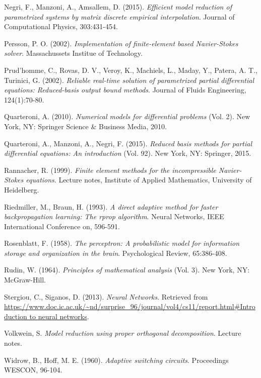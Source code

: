 \documentclass[12pt, a4paper, twoside, openright]{report}
\numberwithin{equation}{chapter}
\theoremstyle{theorem}
\theoremstyle{definition}
\theoremstyle{remark}
\theoremstyle{proposition}
\numberwithin{figure}{chapter}
\begin{document}
\begin{thebibliography}{50}
		Negri, F., Manzoni, A., Amsallem, D. (2015). \emph{Efficient model reduction of parametrized systems by matrix discrete empirical interpolation}. Journal of Computational Physics, 303:431-454.
		
		Persson, P. O. (2002). \emph{Implementation of finite-element based Navier-Stokes solver}. Massachussets Institue of Technology.
		
		Prud'homme, C., Rovas, D. V., Veroy, K., Machiels, L., Maday, Y., Patera, A. T., Turinici, G. (2002). \emph{Reliable real-time solution of parametrized partial differential equations: Reduced-basis output bound methods}. Journal of Fluids Engineering, 124(1):70-80.
		
		Quarteroni, A. (2010). \emph{Numerical models for differential problems} (Vol. 2). New York, NY: Springer Science \& Business Media, 2010.
		
		Quarteroni, A., Manzoni, A., Negri, F. (2015). \emph{Reduced basis methods for partial differential equations: An introduction} (Vol. 92). New York, NY: Springer, 2015.
		
		Rannacher, R. (1999). \emph{Finite element methods for the incompressible Navier-Stokes equations}. Lecture notes, Institute of Applied Mathematics, University of Heidelberg.
		
		Riedmiller, M., Braun, H. (1993). \emph{A direct adaptive method for faster backpropagation learning: The rprop algorithm}. Neural Networks, IEEE International Conference on, 596-591.
		
		Rosenblatt, F. (1958). \emph{The perceptron: A probabilistic model for information storage and organization in the brain}. Psychological Review, 65:386-408.
		
		Rudin, W. (1964). \emph{Principles of mathematical analysis} (Vol. 3). New York, NY: McGraw-Hill.
		
		Stergiou, C., Siganos, D. (2013). \emph{Neural Networks}. Retrieved from \url{https://www.doc.ic.ac.uk/~nd/surprise_96/journal/vol4/cs11/report.html#Introduction to neural networks}.
		
		Volkwein, S. \emph{Model reduction using proper orthogonal decomposition}. Lecture notes.
		
		Widrow, B., Hoff, M. E. (1960). \emph{Adaptive switching circuits}. Proceedings WESCON, 96-104.
		
	\end{thebibliography}	
	
\end{document}
